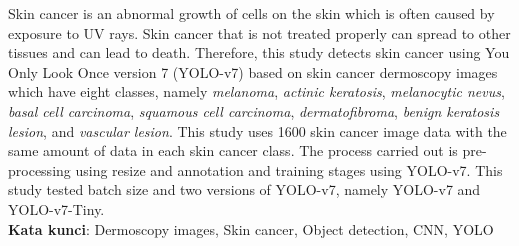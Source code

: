 \documentclass[]{mathuinsa}
\begin{document}
    
    \begin{abstracteng}
        Skin cancer is an abnormal growth of cells on the skin which is often caused by exposure to UV rays. Skin cancer that is not treated properly can spread to other tissues and can lead to death. Therefore, this study detects skin cancer using You Only Look Once version 7 (YOLO-v7) based on skin cancer dermoscopy images which have eight classes, namely \textit{melanoma}, \textit{actinic keratosis}, \textit{melanocytic nevus}, \textit{basal cell carcinoma}, \textit{squamous cell carcinoma}, \textit{dermatofibroma}, \textit{benign keratosis lesion}, and \textit{vascular lesion}. This study uses 1600 skin cancer image data with the same amount of data in each skin cancer class. The process carried out is pre-processing using resize and annotation and training stages using YOLO-v7. This study tested batch size and two versions of YOLO-v7, namely YOLO-v7 and YOLO-v7-Tiny.\\
        \noindent
        \textbf{Kata kunci}: Dermoscopy images, Skin cancer, Object detection, CNN, YOLO
    \end{abstracteng}

    
    
    
    
    


    


    \appendix
    \label{appendix: filter}
\end{document}
